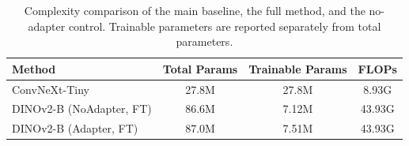 \begin{table}[t]
  \centering
  \caption{Complexity comparison of the main baseline, the full method, and the no-adapter control. Trainable parameters are reported separately from total parameters.}
  \label{tab:complexity_results}
  \begin{tabular}{l c c c}
    \toprule
    Method & Total Params & Trainable Params & FLOPs \\
    \midrule
    ConvNeXt-Tiny & 27.8M & 27.8M & 8.93G \\
    DINOv2-B (NoAdapter, FT) & 86.6M & 7.12M & 43.93G \\
    DINOv2-B (Adapter, FT) & 87.0M & 7.51M & 43.93G \\
    \bottomrule
  \end{tabular}
\end{table}
